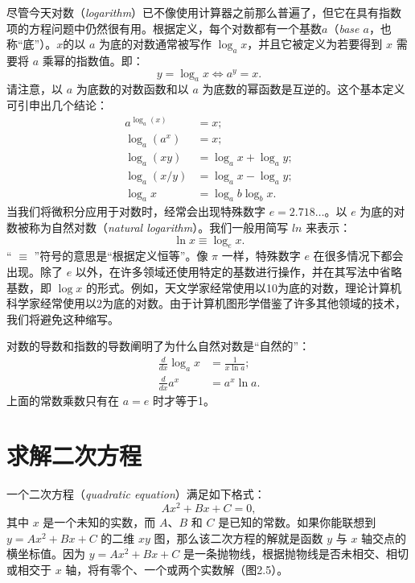 \documentclass[lang=cn,12pt,marginpar=margintrue]{elegantbook}
\begin{document}
尽管今天对数（\textit{logarithm}）已不像使用计算器之前那么普遍了，但它在具有指数项的方程问题中仍然很有用。根据定义，每个对数都有一个基数$a$（\textit{base $a$}，也称“底”）。$x$的以 $a$ 为底的对数通常被写作 $\log_ax$，并且它被定义为若要得到 $x$ 需要将 $a$ 乘幂的指数值。即：
\[
  y = \log_ax \iff a^y = x.
\]
请注意，以 $a$ 为底数的对数函数和以 $a$ 为底数的幂函数是互逆的。这个基本定义可引申出几个结论：
\[
  \begin{aligned}
    a^{\log_a(x)} & = x;               \\
    \log_a(a^x)   & = x;               \\
    \log_a(xy)    & = \log_ax+\log_ay; \\
    \log_a(x/y)   & = \log_ax-\log_ay; \\
    \log_ax       & = \log_ab\log_bx.
  \end{aligned}
\]
当我们将微积分应用于对数时，经常会出现特殊数字 $e=2.718\ldots $。以 $e$ 为底的对数被称为自然对数（\textit{natural logarithm}）。我们一般用简写 $ln$ 来表示：
\[
  \ln x \equiv \log_ex.
\]
“ $\equiv$ ”符号的意思是“根据定义恒等”。像 $\pi$ 一样，特殊数字 $e$ 在很多情况下都会出现。除了 $e$ 以外，在许多领域还使用特定的基数进行操作，并在其写法中省略基数，即 $\log x$ 的形式。例如，天文学家经常使用以10为底的对数，理论计算机科学家经常使用以2为底的对数。由于计算机图形学借鉴了许多其他领域的技术，我们将避免这种缩写。

对数的导数和指数的导数阐明了为什么自然对数是“自然的”：
\[
  \begin{aligned}
    \frac{d}{d x} \log _{a} x & =\frac{1}{x \ln a}; \\
    \frac{d}{d x} a^{x}       & =a^{x} \ln a.
  \end{aligned}
\]
上面的常数乘数只有在 $a = e$ 时才等于1。

\section{求解二次方程}

一个二次方程（\textit{quadratic equation}）满足如下格式：
\[
  Ax^2+Bx+C=0,
\]
其中 $x$ 是一个未知的实数，而 $A$、$B$ 和 $C$ 是已知的常数。如果你能联想到 $y=Ax^2+Bx+C$ 的二维 $xy$ 图，那么该二次方程的解就是函数 $y$ 与 $x$ 轴交点的横坐标值。因为 $y=Ax^2+Bx+C$ 是一条抛物线，根据抛物线是否未相交、相切或相交于 $x$ 轴，将有零个、一个或两个实数解（图2.5）。

\end{document}

